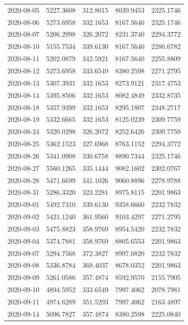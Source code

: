 \begin{footnotesize}
\begin{longtable}{lllll}
2020-08-05 & 5227.3608 & 312.8015 & 8039.9453 & 2325.1746 \\
2020-08-06 & 5273.6958 & 332.1653 & 8167.5640 & 2325.1746 \\
2020-08-07 & 5206.2998 & 326.2072 & 8231.3740 & 2294.3772 \\
2020-08-10 & 5155.7534 & 339.6130 & 8167.5640 & 2286.6782 \\
2020-08-11 & 5202.0879 & 342.5921 & 8167.5640 & 2255.8809 \\
2020-08-12 & 5273.6958 & 333.6549 & 8380.2598 & 2271.2795 \\
2020-08-13 & 5307.3931 & 332.1653 & 8273.9121 & 2317.4753 \\
2020-08-14 & 5395.8506 & 332.1653 & 8082.4849 & 2332.8735 \\
2020-08-18 & 5357.9399 & 332.1653 & 8295.1807 & 2348.2717 \\
2020-08-19 & 5332.6665 & 332.1653 & 8125.0239 & 2309.7759 \\
2020-08-24 & 5320.0298 & 326.2072 & 8252.6426 & 2309.7759 \\
2020-08-25 & 5362.1523 & 327.6968 & 8763.1152 & 2294.3772 \\
2020-08-26 & 5341.0908 & 330.6758 & 8890.7344 & 2325.1746 \\
2020-08-27 & 5560.1265 & 335.1444 & 9082.1602 & 2302.0767 \\
2020-08-28 & 5471.6699 & 341.1026 & 9060.8896 & 2278.9788 \\
2020-08-31 & 5286.3320 & 323.2281 & 8975.8115 & 2201.9863 \\
2020-09-01 & 5492.7310 & 339.6130 & 9358.6660 & 2232.7832 \\
2020-09-02 & 5421.1240 & 361.9560 & 9103.4297 & 2271.2795 \\
2020-09-03 & 5475.8823 & 358.9769 & 8954.5420 & 2232.7832 \\
2020-09-04 & 5374.7881 & 358.9769 & 8805.6553 & 2201.9863 \\
2020-09-07 & 5294.7568 & 372.3827 & 8997.0820 & 2232.7832 \\
2020-09-08 & 5336.8784 & 369.4037 & 8678.0352 & 2201.9863 \\
2020-09-09 & 5261.0586 & 357.4874 & 8592.9570 & 2155.7905 \\
2020-09-10 & 4894.5952 & 333.6549 & 7997.4062 & 2078.7981 \\
2020-09-11 & 4974.6289 & 351.5293 & 7997.4062 & 2163.4897 \\
2020-09-14 & 5096.7827 & 357.4874 & 8380.2598 & 2225.0840 \\

\end{longtable}
\end{footnotesize}
